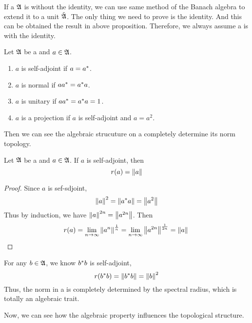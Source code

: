 \documentclass[a4paper,11pt]{report}
\begin{document}
If a \Cs $\mathfrak{A}$ is without the identity, we can use same method of the Banach algebra to extend it to a unit \Cs $\tilde{\mathfrak{A}}$. The only thing we need to prove is the identity. And this can be obtained the result in above proposition. Therefore, we always assume a \Cs is with the identity.

\begin{defn}
	Let $\mathfrak{A}$ be a \Cs and $a \in \mathfrak{A}$.
	\begin{enumerate}[label=\arabic*)]
		\item $a$ is self-adjoint if $a = a^{*}$.
		\item $a$ is normal if $aa^{*} = a^{*}a$.
		\item $a$ is unitary if $aa^{*}=a^{*}a=1$.
		\item $a$ is a projection if $a$ is self-adjoint and $a=a^{2}$.
	\end{enumerate}
\end{defn}

Then we can see the algebraic strucuture on a \Cs completely determine its norm topology.

\begin{thm}
	Let $\mathfrak{A}$ be a \Cs and $a \in \mathfrak{A}$. If $a$ is self-adjoint, then
	\begin{equation*}
		r(a) = \left\lVert a\right\lVert
	\end{equation*}
\end{thm}
\begin{proof}
	Since $a$ is sef-sdjoint,
	\begin{equation*}
		\left\lVert a\right\lVert^{2} = \left\lVert a^{*}a\right\lVert = \left\lVert a^{2}\right\lVert
	\end{equation*}
	Thus by induction, we have $\left\lVert a\right\lVert^{2n} = \left\lVert a^{2n}\right\lVert$. Then
	\begin{equation*}
		r(a) = \lim_{n \rightarrow \infty} \left\lVert a^{n}\right\lVert^{\frac{1}{n}} = \lim_{n \rightarrow \infty} \left\lVert a^{2n}\right\lVert^{\frac{1}{2n}} = \left\lVert a\right\lVert \qedhere
	\end{equation*}
\end{proof}
\begin{rem}
	For any $b \in \mathfrak{A}$, we know $b^{*}b$ is self-adjoint,
	\begin{equation*}
		r(b^{*}b) = \left\lVert b^{*}b\right\lVert = \left\lVert b\right\lVert^{2}
	\end{equation*}
	Thus, the norm in a \Cs is completely determined by the spectral radius, which is totally an algebraic trait.
\end{rem}

Now, we can see how the algebraic property influences the topological structure.
\end{document}
